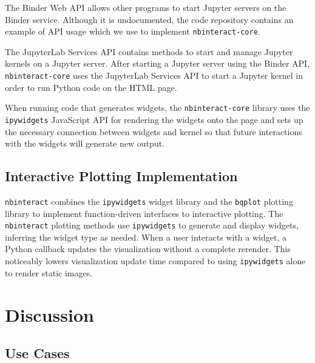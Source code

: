 \documentclass[nobib]{tufte-handout}
\newcommand{\code}[1]{\texttt{#1}}
\begin{document}
The Binder Web API allows other programs to start Jupyter servers on the Binder
service. Although it is undocumented, the code repository contains an example
of API usage which we use to
implement \code{nbinteract-core}.

The JupyterLab Services API contains methods to start and manage Jupyter
kernels on a Jupyter server. After
starting a Jupyter server using the Binder API, \code{nbinteract-core} uses the
JupyterLab Services API to start a Jupyter kernel in order to run Python code
on the HTML page.

When running code that generates widgets, the \code{nbinteract-core} library
uses the \code{ipywidgets} JavaScript API for rendering the widgets onto the
page and sets up
the necessary connection between widgets and kernel so that future interactions
with the widgets will generate new output.


\subsection{Interactive Plotting Implementation} %
\label{sub:interactive_plotting_implementation}

\code{nbinteract} combines the \code{ipywidgets} widget library and the
\code{bqplot} plotting
library to implement function-driven interfaces to interactive plotting. The
\code{nbinteract} plotting methods use \code{ipywidgets} to generate and
display widgets, inferring the widget type as needed. When a user interacts
with a widget, a Python callback updates the visualization without a complete
rerender. This noticeably lowers visualization update time compared to using
\code{ipywidgets} alone to render static images.



\section{Discussion} %
\label{sec:discussion}

\subsection{Use Cases} %
\label{sub:use_cases}
\end{document}
